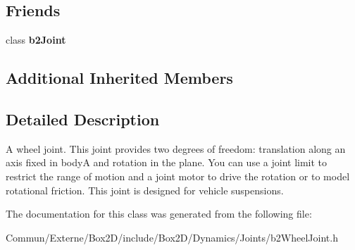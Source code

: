 \subsection*{Friends}
\begin{DoxyCompactItemize}
\item 
class {\bfseries b2\+Joint}\hypertarget{classb2_wheel_joint_a54ade8ed3d794298108d7f4c4e4793fa}{}\label{classb2_wheel_joint_a54ade8ed3d794298108d7f4c4e4793fa}

\end{DoxyCompactItemize}
\subsection*{Additional Inherited Members}


\subsection{Detailed Description}
A wheel joint. This joint provides two degrees of freedom\+: translation along an axis fixed in bodyA and rotation in the plane. You can use a joint limit to restrict the range of motion and a joint motor to drive the rotation or to model rotational friction. This joint is designed for vehicle suspensions. 

The documentation for this class was generated from the following file\+:\begin{DoxyCompactItemize}
\item 
Commun/\+Externe/\+Box2\+D/include/\+Box2\+D/\+Dynamics/\+Joints/b2\+Wheel\+Joint.\+h\end{DoxyCompactItemize}
